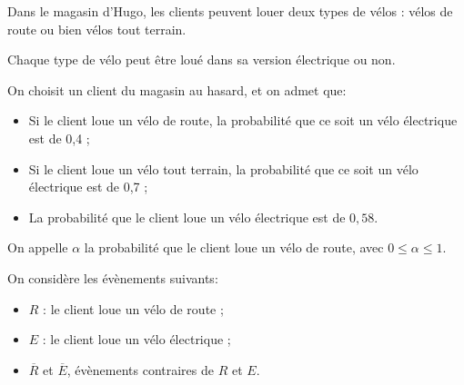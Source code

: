 
\medskip

Dans le magasin d'Hugo, les clients peuvent louer deux types de vélos : vélos de route ou bien vélos tout terrain. 

Chaque type de vélo peut être loué dans sa version électrique ou non.

On choisit un client du magasin au hasard, et on admet que:
\begin{itemize}
\item Si le client loue un vélo de route, la probabilité que ce soit un vélo électrique est de 0,4 ;
\item Si le client loue un vélo tout terrain, la probabilité que ce soit un vélo électrique est de 0,7 ; 
\item La probabilité que le client loue un vélo électrique est de $0,58$.
\end{itemize}

\medskip

On appelle $\alpha$ la probabilité que le client loue un vélo de route, avec $0 \leqslant \alpha \leqslant 1$. 

On considère les évènements suivants:

\begin{itemize}
\item[$\bullet~~$] $R$ : \og le client loue un vélo de route \fg{} ;
\item[$\bullet~~$] $E$ : \og le client loue un vélo électrique \fg{} ;
\item[$\bullet~~$] $\overline{R}$ et $\overline{E}$, évènements contraires de $R$ et $E$.
\end{itemize}


%
%
%

